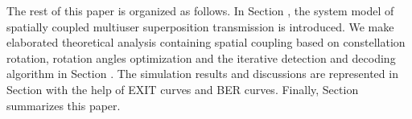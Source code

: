 \documentclass[conference]{IEEEtran}
\begin{document}
The rest of this paper is organized as follows. In Section \uppercase\expandafter{}, the system model of spatially coupled multiuser superposition transmission is introduced. We make elaborated theoretical analysis containing spatial coupling based on constellation rotation, rotation angles optimization and the iterative detection and decoding algorithm in Section \uppercase\expandafter{}. The simulation results and discussions are represented in Section \uppercase\expandafter{} with the help of EXIT curves and BER curves. Finally, Section \uppercase\expandafter{} summarizes this paper.








%
%

\end{document}
